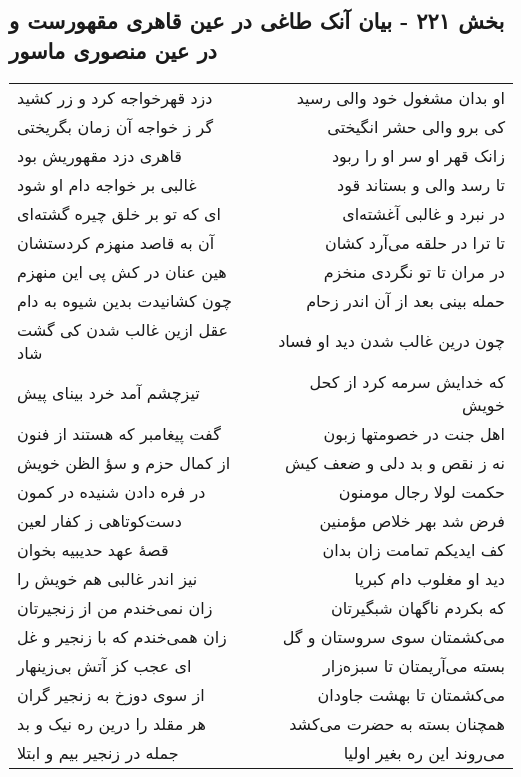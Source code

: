 \begin{center}
\section*{بخش ۲۲۱ - بیان آنک طاغی در عین قاهری مقهورست و در عین منصوری ماسور}
\label{sec:sh221}
\begin{longtable}{l p{0.5cm} r}
دزد قهرخواجه کرد و زر کشید
&&
او بدان مشغول خود والی رسید
\\
گر ز خواجه آن زمان بگریختی
&&
کی برو والی حشر انگیختی
\\
قاهری دزد مقهوریش بود
&&
زانک قهر او سر او را ربود
\\
غالبی بر خواجه دام او شود
&&
تا رسد والی و بستاند قود
\\
ای که تو بر خلق چیره گشته‌ای
&&
در نبرد و غالبی آغشته‌ای
\\
آن به قاصد منهزم کردستشان
&&
تا ترا در حلقه می‌آرد کشان
\\
هین عنان در کش پی این منهزم
&&
در مران تا تو نگردی منخزم
\\
چون کشانیدت بدین شیوه به دام
&&
حمله بینی بعد از آن اندر زحام
\\
عقل ازین غالب شدن کی گشت شاد
&&
چون درین غالب شدن دید او فساد
\\
تیزچشم آمد خرد بینای پیش
&&
که خدایش سرمه کرد از کحل خویش
\\
گفت پیغامبر که هستند از فنون
&&
اهل جنت در خصومتها زبون
\\
از کمال حزم و سؤ الظن خویش
&&
نه ز نقص و بد دلی و ضعف کیش
\\
در فره دادن شنیده در کمون
&&
حکمت لولا رجال مومنون
\\
دست‌کوتاهی ز کفار لعین
&&
فرض شد بهر خلاص مؤمنین
\\
قصهٔ عهد حدیبیه بخوان
&&
کف ایدیکم تمامت زان بدان
\\
نیز اندر غالبی هم خویش را
&&
دید او مغلوب دام کبریا
\\
زان نمی‌خندم من از زنجیرتان
&&
که بکردم ناگهان شبگیرتان
\\
زان همی‌خندم که با زنجیر و غل
&&
می‌کشمتان سوی سروستان و گل
\\
ای عجب کز آتش بی‌زینهار
&&
بسته می‌آریمتان تا سبزه‌زار
\\
از سوی دوزخ به زنجیر گران
&&
می‌کشمتان تا بهشت جاودان
\\
هر مقلد را درین ره نیک و بد
&&
همچنان بسته به حضرت می‌کشد
\\
جمله در زنجیر بیم و ابتلا
&&
می‌روند این ره بغیر اولیا
\\

\end{longtable}
\end{center}
